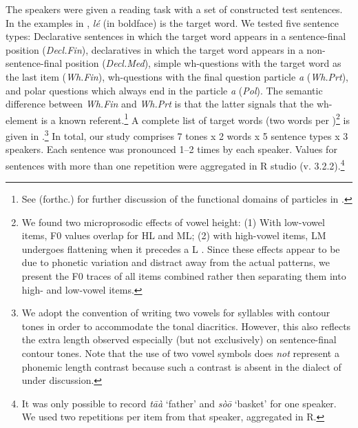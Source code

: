 \documentclass[output=paper,newtxmath,modfonts,nonflat,hidelinks]{langsci/langscibook}
\begin{document}
The speakers were given a reading task with a set of constructed test sentences.
In the examples in , \textit{lé} (in boldface) is the target word.
We tested five sentence types:
Declarative sentences in which the target word appears in a sentence-final position (\textit{Decl.Fin}), declaratives in which the target word appears in a non-sentence-final position (\textit{Decl.Med}), simple wh-questions with the target word as the last item (\textit{Wh.Fin}), wh-questions with the final question particle \textit{a} (\textit{Wh.Prt}), and polar questions which always end in the particle \textit{a} (\textit{Pol}).
The semantic difference between \textit{Wh.Fin} and \textit{Wh.Prt} is that the latter signals that the wh-element is a known referent.\footnote{See \citeauthor{Driemeletal2017} (forthc.) for further discussion of the  functional domains of particles in .}
A complete list of target words (two words per )\footnote{We found two microprosodic effects of vowel height: (1) With low-vowel items, F0 values overlap for  HL and ML; (2) with high-vowel items, LM undergoes flattening when it precedes a L . Since these effects appear to be due to phonetic variation and distract away from the actual  patterns, we present the F0 traces of all items combined rather then separating them into high- and low-vowel items.\label{footnote:gjersoe:microprosody}} is given in .\footnote{We adopt the convention of writing two vowels for syllables with contour tones in order to accommodate the tonal diacritics. However, this also reflects the extra length observed especially (but not exclusively) on sentence-final contour tones. Note that the use of two vowel symbols does \textit{not} represent a phonemic length contrast because such a contrast is absent in the dialect of  under discussion.}
In total, our study comprises 7 tones x 2 words x 5 sentence types x 3 speakers.  %
Each sentence was pronounced 1--2 times by each speaker.
Values for sentences with more than one repetition were aggregated in R studio (v. 3.2.2).\footnote{It was only possible to record \emph{t\=aà} `father' and \emph{s\`o\=o} `basket' for one speaker. We used two repetitions per item from that speaker, aggregated in R.} %
\end{document}
